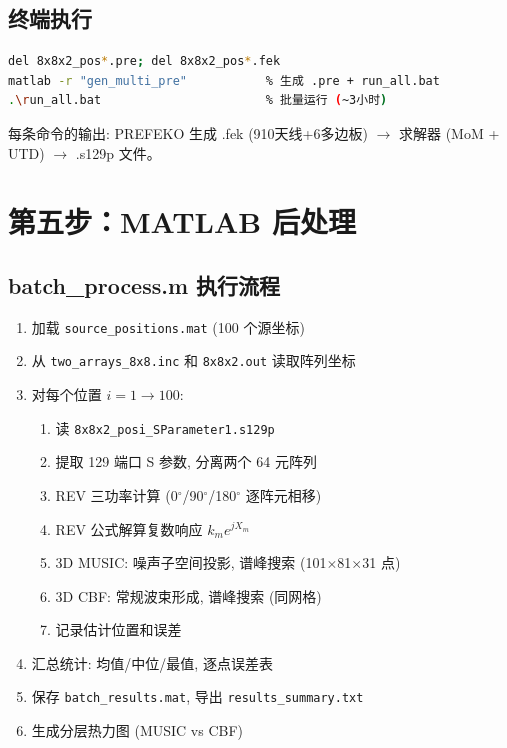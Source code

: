 \documentclass[12pt,a4paper]{ctexart}
\begin{document}
\subsection{终端执行}

\begin{lstlisting}[language=bash]
del 8x8x2_pos*.pre; del 8x8x2_pos*.fek
matlab -r "gen_multi_pre"           % 生成 .pre + run_all.bat
.\run_all.bat                       % 批量运行 (~3小时)
\end{lstlisting}

每条命令的输出: PREFEKO 生成 .fek (910天线+6多边板) $\rightarrow$ 求解器 (MoM + UTD) $\rightarrow$ .s129p 文件。

\section{第五步：MATLAB 后处理}

\subsection{batch\_process.m 执行流程}

\begin{enumerate}[itemsep=3pt]
    \item 加载 \texttt{source\_positions.mat} (100 个源坐标)
    \item 从 \texttt{two\_arrays\_8x8.inc} 和 \texttt{8x8x2.out} 读取阵列坐标
    \item 对每个位置 $i = 1\to 100$:
    \begin{enumerate}
        \item 读 \texttt{8x8x2\_posi\_SParameter1.s129p}
        \item 提取 129 端口 S 参数, 分离两个 64 元阵列
        \item REV 三功率计算 (0$^\circ$/90$^\circ$/180$^\circ$ 逐阵元相移)
        \item REV 公式解算复数响应 $k_m e^{jX_m}$
        \item 3D MUSIC: 噪声子空间投影, 谱峰搜索 (101$\times$81$\times$31 点)
        \item 3D CBF: 常规波束形成, 谱峰搜索 (同网格)
        \item 记录估计位置和误差
    \end{enumerate}
    \item 汇总统计: 均值/中位/最值, 逐点误差表
    \item 保存 \texttt{batch\_results.mat}, 导出 \texttt{results\_summary.txt}
    \item 生成分层热力图 (MUSIC vs CBF)
\end{enumerate}
\end{document}
